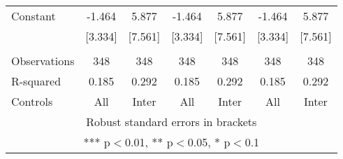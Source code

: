 \begin{tabular}{lcccccc}
Constant & -1.464 & 5.877 & -1.464 & 5.877 & -1.464 & 5.877 \\
 & [3.334] & [7.561] & [3.334] & [7.561] & [3.334] & [7.561] \\
 &  &  &  &  &  &  \\
Observations & 348 & 348 & 348 & 348 & 348 & 348 \\
R-squared & 0.185 & 0.292 & 0.185 & 0.292 & 0.185 & 0.292 \\
 Controls & All & Inter & All & Inter & All & Inter \\ \hline
\multicolumn{7}{c}{ Robust standard errors in brackets} \\
\multicolumn{7}{c}{ *** p$<$0.01, ** p$<$0.05, * p$<$0.1} \\
\end{tabular}
